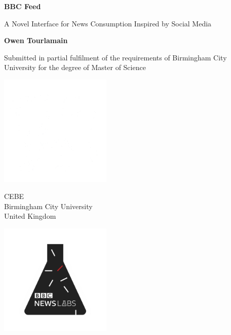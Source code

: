 \documentclass[12pt,titlepage]{article}
\newcommand\NLStart[1]{\AtPageLowerLeft{%
\put(\LenToUnit{.505\paperwidth},\LenToUnit{.12\paperheight}){#1}%
}}%
\newcommand\BCUStart[1]{\AtPageLowerLeft{%
 \put(\LenToUnit{0\paperwidth},\LenToUnit{.12\paperheight}){#1}%
 }}%
\begin{document}
\begin{titlepage}
  \AddToShipoutPictureBG*{
    \BCUStart{\color{bcublue}\rule{.495\paperwidth}{.32\paperheight}}
    \NLStart{\color{bbcnewsred}\rule{.5\paperwidth}{.32\paperheight}}
  }
	\begin{center}
		\vspace*{1cm}

		\begingroup
      \fontsize{24}{30}\selectfont
      \textbf{BBC Feed}
    \endgroup

    \begingroup
      \fontsize{18}{22}\selectfont
      A Novel Interface for News Consumption Inspired by Social Media
    \endgroup

		\vspace{2cm}

		\textbf{Owen Tourlamain}

		\vfill

		Submitted in partial fulfilment of the requirements of Birmingham City University for the degree of Master of Science

		\vspace{0.8cm}

    \begin{multicols}{2}

      \color{white}

  		\includegraphics[width=0.4\textwidth]{../img/bcu-logo.png}

      CEBE\\
  		Birmingham City University\\
  		United Kingdom\\
      \columnbreak

      \includegraphics[width=0.4\textwidth]{../img/nl-logo.png}


\end{multicols}
\end{center}
\end{titlepage}
\end{document}
